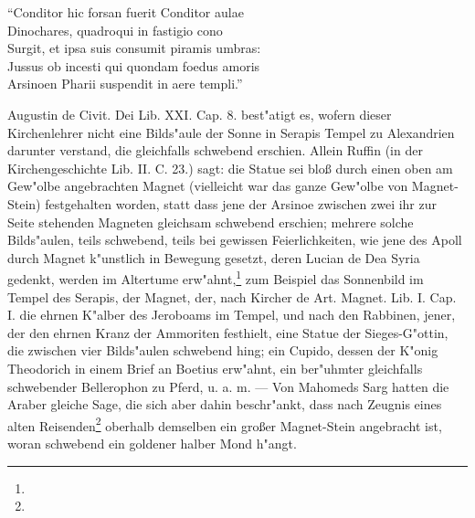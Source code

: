\documentclass[a4paper, 11pt, oneside, polutonikogreek, german]{article}
\begin{document}
"`Conditor hic forsan fuerit Conditor aulae\\
\hspace*{0.5cm} Dinochares, quadroqui in fastigio cono\\
\hspace*{0.5cm} Surgit, et ipsa suis consumit piramis umbras:\\
\hspace*{0.5cm} Jussus ob incesti qui quondam foedus amoris\\
\hspace*{0.5cm} Arsinoen Pharii suspendit in aere templi."'

Augustin de Civit. Dei Lib. XXI. Cap. 8. best"atigt es, wofern dieser Kirchenlehrer nicht eine Bilds"aule der Sonne in Serapis Tempel zu Alexandrien darunter verstand, die gleichfalls schwebend erschien. Allein Ruffin (in der Kirchengeschichte Lib. II. C. 23.) sagt: die Statue sei bloß durch einen oben am Gew"olbe angebrachten Magnet (vielleicht war das ganze Gew"olbe von Magnet-Stein) festgehalten worden, statt dass jene der Arsinoe zwischen zwei ihr zur Seite stehenden Magneten gleichsam schwebend erschien; mehrere solche Bilds"aulen, teils schwebend, teils bei gewissen Feierlichkeiten, wie jene des Apoll durch Magnet k"unstlich in Bewegung gesetzt, deren Lucian de Dea Syria gedenkt, werden im Altertume erw"ahnt,\footnote{} zum Beispiel das Sonnenbild im Tempel des Serapis, der Magnet, der, nach Kircher de Art. Magnet. Lib. I. Cap. I. die ehrnen K"alber des Jeroboams im Tempel, und nach den Rabbinen, jener, der den ehrnen Kranz der Ammoriten festhielt, eine Statue der Sieges-G"ottin, die zwischen vier Bilds"aulen schwebend hing; ein Cupido, dessen der K"onig Theodorich in einem Brief an Boetius erw"ahnt, ein ber"uhmter gleichfalls schwebender Bellerophon zu Pferd, u. a. m. --- Von Mahomeds Sarg hatten die Araber gleiche Sage, die sich aber dahin beschr"ankt, dass nach Zeugnis eines alten Reisenden\footnote{} oberhalb demselben ein großer Magnet-Stein angebracht ist, woran schwebend ein goldener halber Mond h"angt.
\end{document}

